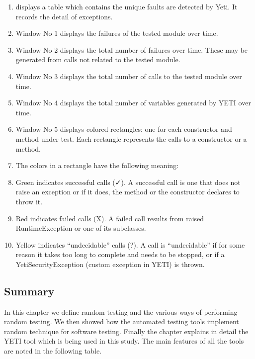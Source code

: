 \begin{enumerate}
\item displays a table which contains the unique faults are detected by Yeti. It records the detail of exceptions.
\item Window No 1 displays the failures of the tested module over time.
\item Window No 2 displays the total number of failures over time. These may be generated from calls not related to the tested module.
\item Window No 3 displays the total number of calls to the tested module over time. 
\item Window No 4 displays the total number of variables generated by YETI over time.
\item Window No 5 displays colored rectangles: one for each constructor and method under test. Each rectangle represents the calls to a constructor or a method.
\item The colors in a rectangle have the following meaning:
\item Green indicates successful calls (✓). A successful call is one that does not raise an exception or if it does, the method or the constructor declares to throw it.
\item Red indicates failed calls (X). A failed call results from raised RuntimeException or one of its subclasses.
\item Yellow indicates “undecidable” calls (?). A call is “undecidable” if for some reason it takes too long to complete and needs to be stopped, or if a YetiSecurityException (custom exception in YETI) is thrown.
\end{enumerate}


\subsection{Summary}
In this chapter we define random testing and the various ways of performing random testing. We then showed how the automated testing tools implement random technique for software testing. Finally the chapter explains in detail the YETI tool which is being used in this study. The main features of all the tools are noted in the following table.

